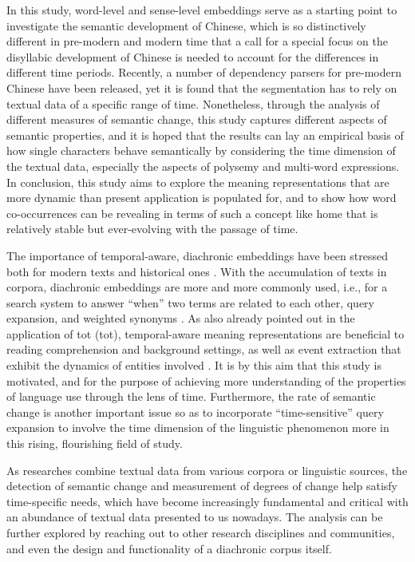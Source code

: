 In this study, word-level and sense-level embeddings serve as a starting point to investigate the semantic development of Chinese, which is so distinctively different in pre-modern and modern time that a call for a special focus on the disyllabic development of Chinese is needed to account for the differences in different time periods. Recently, a number of dependency parsers for pre-modern Chinese have been released, yet it is found that the segmentation has to rely on textual data of a specific range of time. Nonetheless, through the analysis of different measures of semantic change, this study captures different aspects of semantic properties, and it is hoped that the results can lay an empirical basis of how single characters behave semantically by considering the time dimension of the textual data, especially the aspects of polysemy and multi-word expressions. In conclusion, this study aims to explore the meaning representations that are more dynamic than present application is populated for, and to show how word co-occurrences can be revealing in terms of such a concept like home that is relatively stable but ever-evolving with the passage of time.

The importance of temporal-aware, diachronic embeddings have been stressed both for modern texts and historical ones \parencite{huang2019neural,rosin2017learning,ruder2017word}. With the accumulation of texts in corpora, diachronic embeddings are more and more commonly used, i.e., for a search system to answer ``when'' two terms are related to each other, query expansion, and weighted synonyms \parencite{rosin2017learning}. As also already pointed out in the application of \acrlong{tot} (\acrshort{tot}), temporal-aware meaning representations are beneficial to reading comprehension and background settings, as well as event extraction that exhibit the dynamics of entities involved \parencite{wijaya2011understanding}. It is by this aim that this study is motivated, and for the purpose of achieving more understanding of the properties of language use through the lens of time. Furthermore, the rate of semantic change is another important issue so as to incorporate ``time-sensitive'' query expansion \parencite{rosin2017learning} to involve the time dimension of the linguistic phenomenon more in this rising, flourishing field of study.

As researches combine textual data from various corpora or linguistic sources, the detection of semantic change and measurement of degrees of change help satisfy time-specific needs, which have become increasingly fundamental and critical with an abundance of textual data presented to us nowadays. The analysis can be further explored by reaching out to other research disciplines and communities, and even the design and functionality of a diachronic corpus itself.
